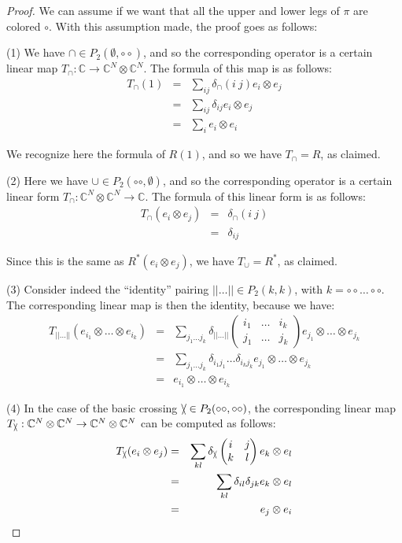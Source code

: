 \documentclass[12pt]{amsbook}
\begin{document}
\begin{proof}
We can assume if we want that all the upper and lower legs of $\pi$ are colored $\circ$. With this assumption made, the proof goes as follows:

\medskip

(1) We have $\cap\in P_2(\emptyset,\circ\circ)$, and so the corresponding operator is a certain linear map $T_\cap:\mathbb C\to\mathbb C^N\otimes\mathbb C^N$. The formula of this map is as follows:
\begin{eqnarray*}
T_\cap(1)
&=&\sum_{ij}\delta_\cap(i\ j)e_i\otimes e_j\\
&=&\sum_{ij}\delta_{ij}e_i\otimes e_j\\
&=&\sum_ie_i\otimes e_i
\end{eqnarray*}

We recognize here the formula of $R(1)$, and so we have $T_\cap=R$, as claimed.

\medskip

(2) Here we have $\cup\in P_2(\circ\circ,\emptyset)$, and so the corresponding operator is a certain linear form $T_\cap:\mathbb C^N\otimes\mathbb C^N\to\mathbb C$. The formula of this linear form is as follows:
\begin{eqnarray*}
T_\cap(e_i\otimes e_j)
&=&\delta_\cap(i\ j)\\
&=&\delta_{ij}
\end{eqnarray*}

Since this is the same as $R^*(e_i\otimes e_j)$, we have $T_\cup=R^*$, as claimed.

\medskip

(3) Consider indeed the ``identity'' pairing $||\ldots||\in P_2(k,k)$, with $k=\circ\circ\ldots\circ\circ$. The corresponding linear map is then the identity, because we have:
\begin{eqnarray*}
T_{||\ldots||}(e_{i_1}\otimes\ldots\otimes e_{i_k})
&=&\sum_{j_1\ldots j_k}\delta_{||\ldots||}\begin{pmatrix}i_1&\ldots&i_k\\ j_1&\ldots&j_k\end{pmatrix}e_{j_1}\otimes\ldots\otimes e_{j_k}\\
&=&\sum_{j_1\ldots j_k}\delta_{i_1j_1}\ldots\delta_{i_kj_k}e_{j_1}\otimes\ldots\otimes e_{j_k}\\
&=&e_{i_1}\otimes\ldots\otimes e_{i_k}
\end{eqnarray*}

(4) In the case of the basic crossing $\slash\hskip-2.0mm\backslash\in P_2(\circ\circ,\circ\circ)$, the corresponding linear map $T_{\slash\hskip-1.5mm\backslash}:\mathbb C^N\otimes\mathbb C^N\to\mathbb C^N\otimes\mathbb C^N$ can be computed as follows:
\begin{eqnarray*}
T_{\slash\hskip-1.5mm\backslash}(e_i\otimes e_j)
&=&\sum_{kl}\delta_{\slash\hskip-1.5mm\backslash}\begin{pmatrix}i&j\\ k&l\end{pmatrix}e_k\otimes e_l\\
&=&\sum_{kl}\delta_{il}\delta_{jk}e_k\otimes e_l\\
&=&e_j\otimes e_i
\end{eqnarray*}


\end{proof}
\end{document}
